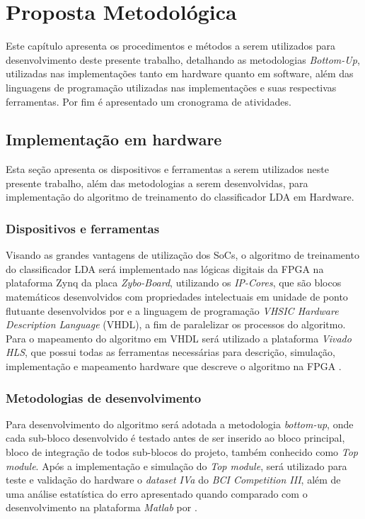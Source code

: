 \chapter[Proposta Metodológica]{Proposta Metodológica}
Este capítulo apresenta os procedimentos e métodos a serem utilizados para desenvolvimento deste presente trabalho, detalhando as metodologias \textit{Bottom-Up}, utilizadas nas implementações tanto em hardware quanto em software, além das linguagens de programação utilizadas nas implementações e suas respectivas ferramentas. Por fim é apresentado um cronograma de atividades.

\section{Implementação em hardware}
Esta seção apresenta os dispositivos e ferramentas a serem utilizados neste presente trabalho, além das metodologias a serem desenvolvidas, para implementação do algoritmo de treinamento do classificador LDA em Hardware.

\subsection{Dispositivos e ferramentas}
Visando as grandes vantagens de utilização dos SoCs, o algoritmo de treinamento do classificador LDA será implementado nas lógicas digitais da FPGA na plataforma Zynq da placa \textit{Zybo-Board}, utilizando os \textit{IP-Cores}, que são blocos matemáticos desenvolvidos com propriedades intelectuais \cite{munoz2010tradeoff} em unidade de ponto flutuante desenvolvidos por \cite{munoz2010tradeoff} e a linguagem de programação \textit{VHSIC Hardware Description Language} (VHDL), a fim de paralelizar os processos do algoritmo. Para o mapeamento do algoritmo em VHDL será utilizado a plataforma \textit{Vivado HLS}, que possui todas as ferramentas necessárias para descrição, simulação, implementação e mapeamento hardware que descreve o algoritmo na FPGA \cite{zynqBook}.

\subsection{Metodologias de desenvolvimento}
Para desenvolvimento do algoritmo será adotada a metodologia \textit{bottom-up}, onde cada sub-bloco desenvolvido é testado antes de ser inserido ao bloco principal, bloco de integração de todos sub-blocos do projeto, também conhecido como \textit{Top module}.
Após a implementação e simulação do \textit{Top module}, será utilizado para teste e validação do hardware
 o \textit{dataset IVa} do \textit{BCI Competition III}, além de uma análise estatística do erro apresentado
 quando comparado com o desenvolvimento na plataforma \textit{Matlab} por \cite{F.Lotte}.

